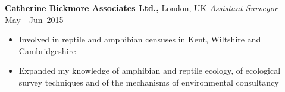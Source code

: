 
\vspace{7pt}

\textbf{Catherine Bickmore Associates Ltd.,} London, UK\newline
\emph{Assistant Surveyor} \hfill{May–--Jun~2015}
\begin{itemize}
  \item Involved in reptile and amphibian censuses in Kent, Wiltshire and Cambridgeshire
  \item Expanded my knowledge of amphibian and reptile ecology, of ecological survey techniques and of the mechanisms of environmental consultancy
\end{itemize}
